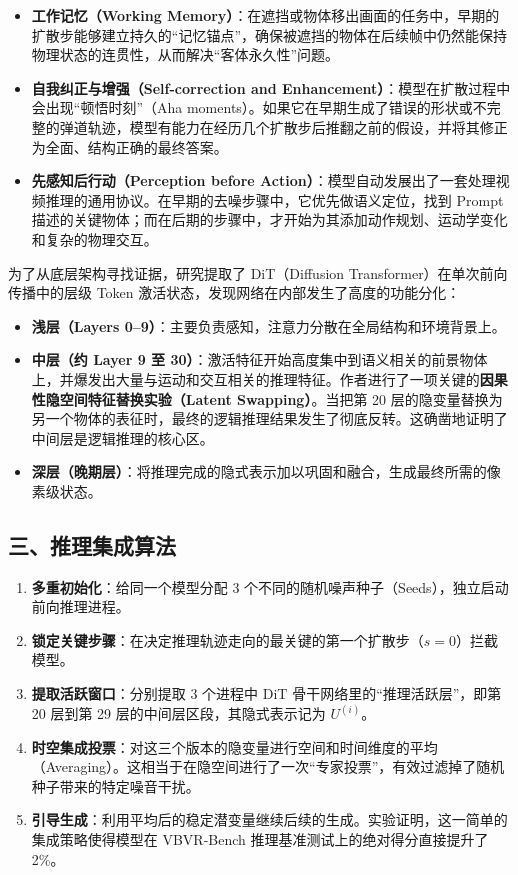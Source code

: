 \begin{itemize}
\tightlist
\item
  \textbf{工作记忆（Working Memory）}：在遮挡或物体移出画面的任务中，早期的扩散步能够建立持久的``记忆锚点''，确保被遮挡的物体在后续帧中仍然能保持物理状态的连贯性，从而解决``客体永久性''问题。
\item
  \textbf{自我纠正与增强（Self-correction and Enhancement）}：模型在扩散过程中会出现``顿悟时刻''（Aha moments）。如果它在早期生成了错误的形状或不完整的弹道轨迹，模型有能力在经历几个扩散步后推翻之前的假设，并将其修正为全面、结构正确的最终答案。
\item
  \textbf{先感知后行动（Perception before Action）}：模型自动发展出了一套处理视频推理的通用协议。在早期的去噪步骤中，它优先做语义定位，找到 Prompt 描述的关键物体；而在后期的步骤中，才开始为其添加动作规划、运动学变化和复杂的物理交互。
\end{itemize}

为了从底层架构寻找证据，研究提取了 DiT（Diffusion Transformer）在单次前向传播中的层级 Token 激活状态，发现网络在内部发生了高度的功能分化：

\begin{itemize}
\tightlist
\item
  \textbf{浅层（Layers 0--9）}：主要负责感知，注意力分散在全局结构和环境背景上。
\item
  \textbf{中层（约 Layer 9 至 30）}：激活特征开始高度集中到语义相关的前景物体上，并爆发出大量与运动和交互相关的推理特征。作者进行了一项关键的\textbf{因果性隐空间特征替换实验（Latent Swapping）}。当把第 20 层的隐变量替换为另一个物体的表征时，最终的逻辑推理结果发生了彻底反转。这确凿地证明了中间层是逻辑推理的核心区。
\item
  \textbf{深层（晚期层）}：将推理完成的隐式表示加以巩固和融合，生成最终所需的像素级状态。
\end{itemize}

\hypertarget{ux4e09ux63a8ux7406ux96c6ux6210ux7b97ux6cd5}{%
\subsection{三、推理集成算法}\label{ux4e09ux63a8ux7406ux96c6ux6210ux7b97ux6cd5}}

\begin{enumerate}
\def\labelenumi{\arabic{enumi}.}
\tightlist
\item
  \textbf{多重初始化}：给同一个模型分配 3 个不同的随机噪声种子（Seeds），独立启动前向推理进程。
\item
  \textbf{锁定关键步骤}：在决定推理轨迹走向的最关键的第一个扩散步（\(s=0\)）拦截模型。
\item
  \textbf{提取活跃窗口}：分别提取 3 个进程中 DiT 骨干网络里的``推理活跃层''，即第 20 层到第 29 层的中间层区段，其隐式表示记为 \(U^{(i)}\)。
\item
  \textbf{时空集成投票}：对这三个版本的隐变量进行空间和时间维度的平均（Averaging）。这相当于在隐空间进行了一次``专家投票''，有效过滤掉了随机种子带来的特定噪音干扰。
\item
  \textbf{引导生成}：利用平均后的稳定潜变量继续后续的生成。实验证明，这一简单的集成策略使得模型在 VBVR-Bench 推理基准测试上的绝对得分直接提升了 2\%。
\end{enumerate}

